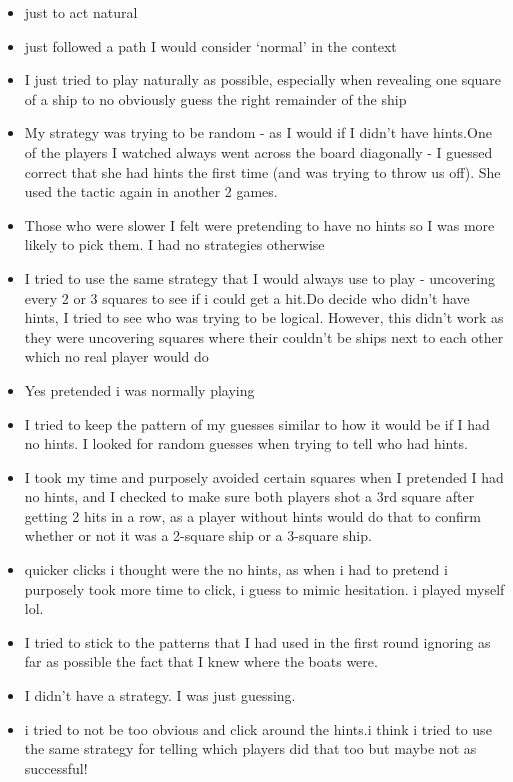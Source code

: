 \documentclass[
  english,
  man]{apa6}
\begin{document}
\begin{itemize}
  some seemed too lucky to be true - otherwise those who had hints i guessed were those who did it quicker without thinking time between rounds
\item
  just to act natural
\item
  just followed a path I would consider `normal' in the context
\item
  I just tried to play naturally as possible, especially when revealing one square of a ship to no obviously guess the right remainder of the ship
\item
  My strategy was trying to be random - as I would if I didn't have hints.One of the players I watched always went across the board diagonally - I guessed correct that she had hints the first time (and was trying to throw us off). She used the tactic again in another 2 games.
\item
  Those who were slower I felt were pretending to have no hints so I was more likely to pick them. I had no strategies otherwise
\item
  I tried to use the same strategy that I would always use to play - uncovering every 2 or 3 squares to see if i could get a hit.Do decide who didn't have hints, I tried to see who was trying to be logical. However, this didn't work as they were uncovering squares where their couldn't be ships next to each other which no real player would do
\item
  Yes pretended i was normally playing
\item
  I tried to keep the pattern of my guesses similar to how it would be if I had no hints. I looked for random guesses when trying to tell who had hints.
\item
  I took my time and purposely avoided certain squares when I pretended I had no hints, and I checked to make sure both players shot a 3rd square after getting 2 hits in a row, as a player without hints would do that to confirm whether or not it was a 2-square ship or a 3-square ship.
\item
  quicker clicks i thought were the no hints, as when i had to pretend i purposely took more time to click, i guess to mimic hesitation. i played myself lol.
\item
  I tried to stick to the patterns that I had used in the first round ignoring as far as possible the fact that I knew where the boats were.
\item
  I didn't have a strategy. I was just guessing.
\item
  i tried to not be too obvious and click around the hints.i think i tried to use the same strategy for telling which players did that too but maybe not as successful!

\end{itemize}
\end{document}
